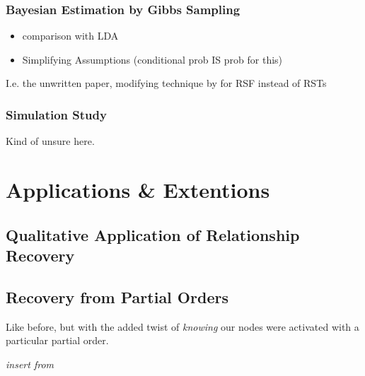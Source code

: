 \documentclass[%
	12pt,
		oneside,
		letterpaper
]{book}
\providecommand{\tightlist}{%
  \setlength{\itemsep}{0pt}\setlength{\parskip}{0pt}}\usepackage{longtable,booktabs,array}
\begin{document}
\section{Bayesian Estimation by Gibbs
Sampling}\label{bayesian-estimation-by-gibbs-sampling}

\begin{itemize}
\tightlist
\item
  comparison with LDA
\item
  Simplifying Assumptions (conditional prob IS prob for this)
\end{itemize}

I.e. the unwritten paper, modifying technique by
\textcite{BayesianSpanningTree_Duan2021} for RSF instead of RSTs

\section{Simulation Study}\label{simulation-study-1}

Kind of unsure here.

\part{Applications \& Extentions}

\chapter{Qualitative Application of Relationship
Recovery}\label{qualitative-application-of-relationship-recovery}

\chapter{Recovery from Partial
Orders}\label{recovery-from-partial-orders}

Like before, but with the added twist of \emph{knowing} our nodes were
activated with a particular partial order.

\emph{insert from
\autocite{OrganizingTaggedKnowledge_Sexton2020,UsingSemanticFluency_Sexton2019}}


\printbibliography
\end{document}
